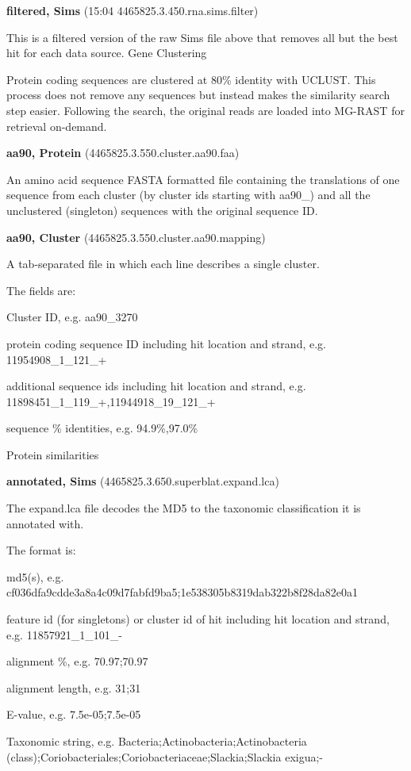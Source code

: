 \documentclass[12pt,fullpage]{report}
\begin{document}
\begin{appendices}
\begin{mdframed}
\textbf{filtered, Sims} (15:04 4465825.3.450.rna.sims.filter)

This is a filtered version of the raw Sims file above that removes all but the best hit for each data source.
Gene Clustering

Protein coding sequences are clustered at 80\% identity with UCLUST. This process does not remove any sequences but instead makes the similarity search step easier. Following the search, the original reads are loaded into MG-RAST for retrieval on-demand.

\textbf{aa90, Protein} (4465825.3.550.cluster.aa90.faa)

An amino acid sequence FASTA formatted file containing the translations of one sequence from each cluster (by cluster ids starting with aa90\_) and all the unclustered (singleton) sequences with the original sequence ID.

\textbf{aa90, Cluster} (4465825.3.550.cluster.aa90.mapping)

A tab-separated file in which each line describes a single cluster.

The fields are:

    Cluster ID, e.g. aa90\_3270

    protein coding sequence ID including hit location and strand, e.g. 11954908\_1\_121\_+

    additional sequence ids including hit location and strand, e.g. 11898451\_1\_119\_+,11944918\_19\_121\_+

    sequence \% identities, e.g. 94.9\%,97.0\%

Protein similarities

\textbf{annotated, Sims} (4465825.3.650.superblat.expand.lca)

The expand.lca file decodes the \gls{MD5} to the taxonomic classification it is annotated with.

The format is:

    md5(s), e.g. cf036dfa9cdde3a8a4c09d7fabfd9ba5;1e538305b8319dab322b8f28da82e0a1

    feature id (for singletons) or cluster id of hit including hit location and strand, e.g. 11857921\_1\_101\_-

    alignment \%, e.g. 70.97;70.97

    alignment length, e.g. 31;31

    E-value, e.g. 7.5e-05;7.5e-05

    Taxonomic string, e.g. Bacteria;Actinobacteria;Actinobacteria (class);Coriobacteriales;Coriobacteriaceae;Slackia;Slackia exigua;-


\end{mdframed}
\end{appendices}
\end{document}
